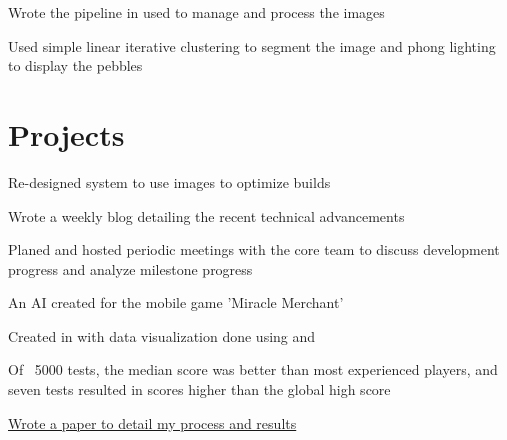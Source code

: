 \documentclass[]{deedy-resume-openfont}
\begin{document}
\begin{minipage}[t]{0.66\textwidth}
\begin{tightemize}
\item Wrote the pipeline in used to manage and process the images

\item Used simple linear iterative clustering to segment the image and phong lighting to display the pebbles

\end{tightemize}
\sectionsep

\section{Projects}

\begin{tightemize}

\item Re-designed system to use images to optimize builds

\item Wrote a weekly blog detailing the recent technical advancements

\item Planed and hosted periodic meetings with the core team to discuss development progress and analyze milestone progress

\end{tightemize}
\sectionsep
{}
\begin{tightemize}

\item An AI created for the mobile game 'Miracle Merchant'

\item Created in with data visualization done using and 

\item Of ~5000 tests, the median score was better than most experienced players, and seven tests resulted in scores higher than the global high score

\item \href{https://github.com/AngelOnFira/Miracle-Merchant-AI/blob/master/Miracle_Merchant.pdf}{Wrote a paper to detail my process and results}

\end{tightemize}
\sectionsep


\end{minipage}
\end{document}
